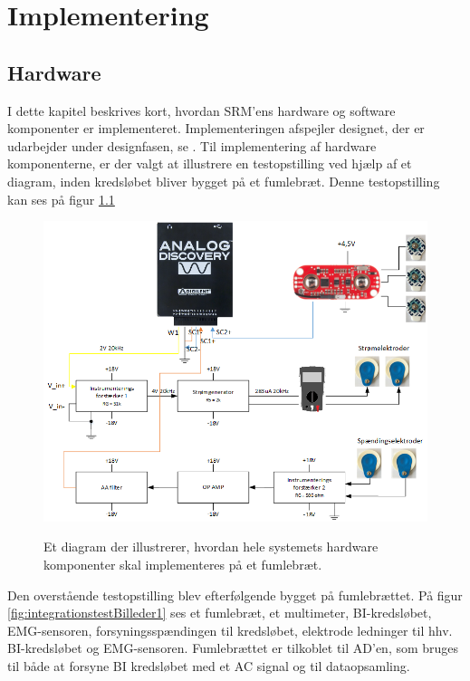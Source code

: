 \chapter{Implementering}

\section{Hardware}
I dette kapitel beskrives kort, hvordan SRM'ens hardware og software komponenter er implementeret. Implementeringen afspejler designet, der er udarbejder under designfasen, se .  Til implementering af hardware komponenterne, er der valgt at illustrere en testopstilling ved hjælp af et diagram, inden kredsløbet bliver bygget på et fumlebræt. Denne testopstilling kan ses på figur \ref{fig:integrationstestDiagram}

\begin{figure}[H] 
\centering
{\includegraphics[width=\linewidth]
{Figure/integrationstestDiagram}}
\caption{Et diagram der illustrerer, hvordan hele systemets hardware komponenter skal implementeres på et fumlebræt. }
\label{fig:integrationstestDiagram}
\end{figure}

\pagebreak
Den overstående testopstilling blev efterfølgende bygget på fumlebrættet. På figur \ref{fig:integrationstestBilleder1} ses et fumlebræt, et multimeter,  BI-kredsløbet, EMG-sensoren, forsyningsspændingen til kredsløbet, elektrode ledninger til hhv. BI-kredsløbet og EMG-sensoren. Fumlebrættet er tilkoblet til AD'en, som bruges til både at forsyne BI kredsløbet med et AC signal og til dataopsamling. 


